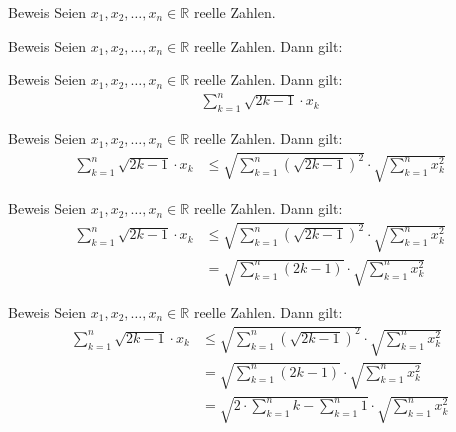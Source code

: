 \documentclass[10pt]{beamer}
\def\bR{\mathbb{R}}
\begin{document}
\begin{frame}{Beweis}
    Seien \( x_{1}, x_{2}, \ldots, x_{n} \in \bR \) reelle Zahlen.
\end{frame}



\begin{frame}{Beweis}
    Seien \( x_{1}, x_{2}, \ldots, x_{n} \in \bR \) reelle Zahlen. Dann gilt:
\end{frame}



\begin{frame}{Beweis}
    Seien \( x_{1}, x_{2}, \ldots, x_{n} \in \bR \) reelle Zahlen. Dann gilt:
    \begin{align*}
        \sum_{k = 1}^{n} \sqrt{2k - 1} \cdot x_{k}
    \end{align*}
\end{frame}



\begin{frame}{Beweis}
    Seien \( x_{1}, x_{2}, \ldots, x_{n} \in \bR \) reelle Zahlen. Dann gilt:
    \begin{align*}
        \sum_{k = 1}^{n} \sqrt{2k - 1} \cdot x_{k}
        & \leq \sqrt{\sum_{k = 1}^{n} \left( \sqrt{2k - 1} \right)^{2}} \cdot \sqrt{\sum_{k = 1}^{n} x_{k}^{2}} 
    \end{align*}
\end{frame}



\begin{frame}{Beweis}
    Seien \( x_{1}, x_{2}, \ldots, x_{n} \in \bR \) reelle Zahlen. Dann gilt:
    \begin{align*}
        \sum_{k = 1}^{n} \sqrt{2k - 1} \cdot x_{k}
        & \leq \sqrt{\sum_{k = 1}^{n} \left( \sqrt{2k - 1} \right)^{2}} \cdot \sqrt{\sum_{k = 1}^{n} x_{k}^{2}} \\
        & = \sqrt{\sum_{k = 1}^{n} \left( 2k - 1 \right)} \cdot \sqrt{\sum_{k = 1}^{n} x_{k}^{2}}
    \end{align*}
\end{frame}



\begin{frame}{Beweis}
    Seien \( x_{1}, x_{2}, \ldots, x_{n} \in \bR \) reelle Zahlen. Dann gilt:
    \begin{align*}
        \sum_{k = 1}^{n} \sqrt{2k - 1} \cdot x_{k}
        & \leq \sqrt{\sum_{k = 1}^{n} \left( \sqrt{2k - 1} \right)^{2}} \cdot \sqrt{\sum_{k = 1}^{n} x_{k}^{2}} \\
        & = \sqrt{\sum_{k = 1}^{n} \left( 2k - 1 \right)} \cdot \sqrt{\sum_{k = 1}^{n} x_{k}^{2}} \\
        & = \sqrt{2 \cdot \sum_{k = 1}^{n} k - \sum_{k = 1}^{n} 1} \cdot \sqrt{\sum_{k = 1}^{n} x_{k}^{2}}
    \end{align*}
\end{frame}
\end{document}
